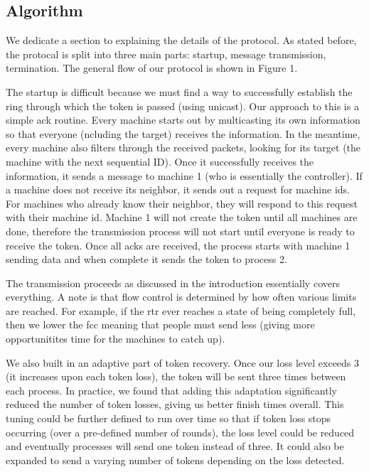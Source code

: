 \documentclass[12pt,journal,compsoc]{IEEEtran}
\begin{document}
\subsection{Algorithm}
We dedicate a section to explaining the details of the protocol. As stated before, the protocal is split into three main parts: startup, message transmission, termination. The general flow of our protocol is shown in Figure 1.

The startup is difficult because we must find a way to successfully establish the ring through which the token is passed (using unicast). Our approach to this is a simple ack routine. Every machine starts out by multicasting its own information so that everyone (ncluding the target) receives the information. In the meantime, every machine also filters through the received packets, looking for its target (the machine with the next sequential ID). Once it successfully receives the information, it sends a message to machine 1 (who is essentially the controller). If a machine does not receive its neighbor, it sends out a request for machine ids.  For machines who already know their neighbor, they will respond to this request with their machine id.  Machine 1 will not create the token until all machines are done, therefore the transmission process will not start until everyone is ready to receive the token. Once all acks are received, the process starts with machine 1 sending data and when complete it sends the token to process 2.

The transmission proceeds as discussed in the introduction essentially covers everything. A note is that flow control is determined by how often various limits are reached. For example, if the rtr ever reaches a state of being completely full, then we lower the fcc meaning that people must send less (giving more opportunitites time for the machines to catch up).

We also built in an adaptive part of token recovery.  Once our loss level exceeds 3 (it increases upon each token loss), the token will be sent three times between each process.  In practice, we found that adding this adaptation significantly reduced the number of token losses, giving us better finish times overall.  This tuning could be further defined to run over time so that if token loss stops occurring (over a pre-defined number of rounds), the loss level could be reduced and eventually processes will send one token instead of three.  It could also be expanded to send a varying number of tokens depending on the loss detected.  
\end{document}
